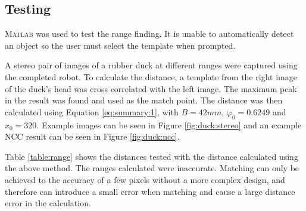 \subsection{Testing}
\textsc{Matlab} was used to test the range finding. It is unable to automatically detect an object so the user must select the template when prompted. 

A stereo pair of images of a rubber duck at different ranges were captured using the completed robot. To calculate the distance, a template from the right image of the duck's head was cross correlated with the left image. The maximum peak in the result was found and used as the match point. The distance was then calculated using Equation \eqref{eq:summary:1}, with $B=42mm$, $\varphi_0=0.6249$ and $x_0=320$. Example images can be seen in Figure \ref{fig:duck:stereo} and an example NCC result can be seen in Figure \ref{fig:duck:ncc}. 

Table \ref{table:range} shows the distances tested with the distance calculated using the above method. The ranges calculated were inaccurate. Matching can only be achieved to the accuracy of a few pixels without a more complex design, and therefore can introduce a small error when matching and cause a large distance error in the calculation. 

